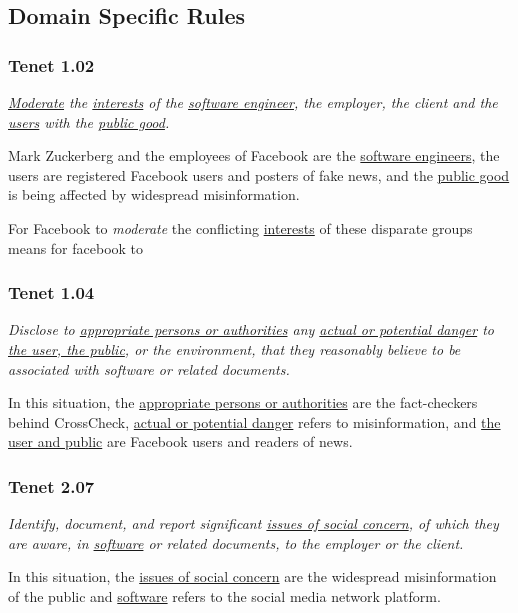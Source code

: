 
\subsection{Domain Specific Rules}

\subsubsection{Tenet 1.02}

\emph{\underline{Moderate} the \underline{interests} of the \underline{software engineer}, the employer, the client and the \underline{users} with the \underline{public good}. \cite{se_code}}

Mark Zuckerberg and the employees of Facebook are the \underline{software engineers}, the users are registered Facebook users and posters of fake news, and the \underline{public good} is being affected by widespread misinformation.

For Facebook to \emph{moderate} the conflicting \underline{interests} of these disparate groups means for facebook to 

\subsubsection{Tenet 1.04}

\emph{Disclose to \underline{appropriate persons or authorities} any \underline{actual or potential danger} to \underline{the user, the public}, or the environment, that they reasonably believe to be associated with software or related documents. \cite{se_code}}

In this situation, the \underline{appropriate persons or authorities} are the fact-checkers behind CrossCheck, \underline{actual or potential danger} refers to misinformation, and \underline{the user and public} are Facebook users and readers of news.

\subsubsection{Tenet 2.07}

\emph{Identify, document, and report significant \underline{issues of social concern}, of which they are aware, in \underline{software} or related documents, to the employer or the client. \cite{se_code}}

In this situation, the \underline{issues of social concern} are the widespread misinformation of the public and \underline{software} refers to the social media network platform.

